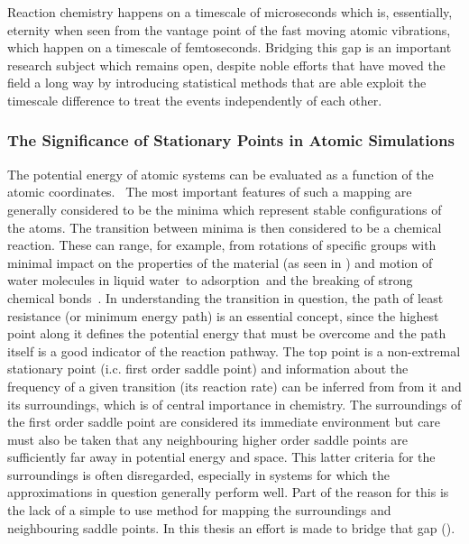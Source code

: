 Reaction chemistry happens on a timescale of microseconds which is, essentially, eternity when seen from the vantage point of the fast moving atomic vibrations, which happen on a timescale of femtoseconds.
Bridging this gap is an important research subject which remains open, despite noble efforts that have moved the field a long way by introducing statistical methods that are able exploit the timescale difference to treat the events independently of each other.\cite{tst-eyring-1935, tst-polanyi-1935, tst-wigner-1938, htst-wert-1949, htst-vineyard-1957, tst-1990}

\subsubsection{The Significance of Stationary Points in Atomic Simulations}
The potential energy of atomic systems can be evaluated as a function of the atomic coordinates.~\cite{born-oppenheimer-1927, schrodinger-equation-1926, kohn-1999}
The most important features of such a mapping are generally considered to be the minima which represent stable configurations of the atoms.
The transition between minima is then considered to be a chemical reaction.
These can range, for example, from rotations of specific groups with minimal impact on the properties of the material (as seen in ) and motion of water molecules in liquid water~\citemiss to adsorption~\citemiss and the breaking of strong chemical bonds~\citemiss.
In understanding the transition in question, the path of least resistance (or minimum energy path) is an essential concept, since the highest point along it defines the potential energy that must be overcome and the path itself is a good indicator of the reaction pathway.
The top point is a non-extremal stationary point (i.c. first order saddle point) and information about the frequency of a given transition (its reaction rate) can be inferred from from it and its surroundings, which is of central importance in chemistry.\cite{htst-wert-1949, htst-vineyard-1957}
The surroundings of the first order saddle point are considered its immediate environment but care must also be taken that any neighbouring higher order saddle points are sufficiently far away in potential energy and space.
This latter criteria for the surroundings is often disregarded, especially in systems for which the approximations in question generally perform well.
Part of the reason for this is the lack of a simple to use method for mapping the surroundings and neighbouring saddle points.
In this thesis an effort is made to bridge that gap ().

